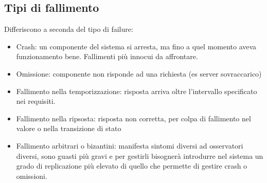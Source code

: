 \documentclass[16px]{article}
\begin{document}
\subsection{Tipi di fallimento}
Differiscono a seconda del tipo di failure:
\begin{itemize}
\item Crash: un componente del sistema si arresta, ma fino a quel momento aveva funzionamento bene. Fallimenti più innocui da affrontare.
\item Omissione: componente non risponde ad una richiesta (es server sovraccarico)
\item Fallimento nella temporizzazione: risposta arriva oltre l'intervallo specificato nei requisiti.
\item Fallimento nella ripsosta: risposta non corretta, per colpa di fallimento nel valore o nella transizione di stato
\item Fallimento arbitrari o bizantini: manifesta sintomi diversi ad osservatori diversi, sono guasti più gravi e per gestirli bisognerà introdurre nel sistema un grado di replicazione più elevato di quello che permette di gestire crash o omissioni.
\end{itemize}
\end{document}
